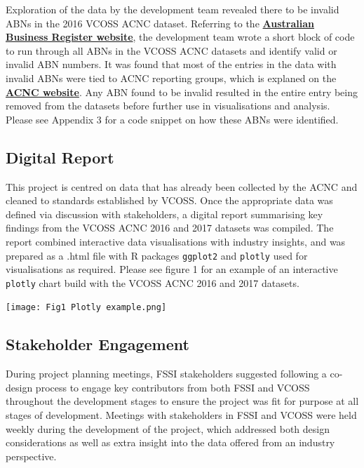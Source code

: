 \documentclass[
  11pt,
]{article}
\let\origfigure\figure
\let\endorigfigure\endfigure
\renewenvironment{figure}[1][2] {
    \expandafter\origfigure\expandafter[H]
} {
    \endorigfigure
}
\begin{document}
Exploration of the data by the development team revealed there to be invalid ABNs in the 2016 VCOSS ACNC dataset. Referring to the \href{https://abr.business.gov.au/Help/AbnFormat}{\textbf{Australian Business Register website}}, the development team wrote a short block of code to run through all ABNs in the VCOSS ACNC datasets and identify valid or invalid ABN numbers. It was found that most of the entries in the data with invalid ABNs were tied to ACNC reporting groups, which is explaned on the \href{https://www.acnc.gov.au/for-charities/manage-your-charity/obligations-acnc/reporting-annually-acnc/group-reporting-and-bulk}{\textbf{ACNC website}}.
Any ABN found to be invalid resulted in the entire entry being removed from the datasets before further use in visualisations and analysis. Please see Appendix 3 for a code snippet on how these ABNs were identified.

\hypertarget{digital-report}{%
\subsection{Digital Report}\label{digital-report}}

This project is centred on data that has already been collected by the ACNC and cleaned to standards established by VCOSS. Once the appropriate data was defined via discussion with stakeholders, a digital report summarising key findings from the VCOSS ACNC 2016 and 2017 datasets was compiled. The report combined interactive data visualisations with industry insights, and was prepared as a .html file with R packages \texttt{ggplot2} and \texttt{plotly} used for visualisations as required. Please see figure 1 for an example of an interactive \texttt{plotly} chart build with the VCOSS ACNC 2016 and 2017 datasets.

\begin{figure}
\centering
\texttt{[image: Fig1 Plotly example.png]}
\caption{A \texttt{Plotly} interactive plot using the ACNC dataset to visualise funding sources for each main activity}
\end{figure}

\hypertarget{stakeholder-engagement}{%
\subsection{Stakeholder Engagement}\label{stakeholder-engagement}}

During project planning meetings, FSSI stakeholders suggested following a co-design process to engage key contributors from both FSSI and VCOSS throughout the development stages to ensure the project was fit for purpose at all stages of development. Meetings with stakeholders in FSSI and VCOSS were held weekly during the development of the project, which addressed both design considerations as well as extra insight into the data offered from an industry perspective.
\end{document}

